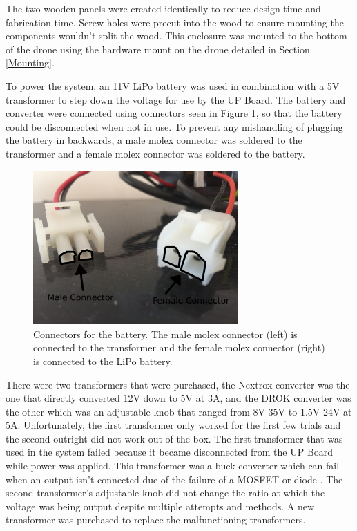 The two wooden panels were created identically to reduce design time and fabrication time. Screw holes were precut into the wood to ensure mounting the components wouldn't split the wood. This enclosure was mounted to the bottom of the drone using the hardware mount on the drone detailed in Section \ref{Mounting}. \par

To power the system, an 11V LiPo battery was used in combination with a 5V transformer to step down the voltage for use by the UP Board. The battery and converter were connected using connectors seen in Figure \ref{fig:connectors}, so that the battery could be disconnected when not in use. To prevent any mishandling of plugging the battery in backwards, a male molex connector was soldered to the transformer and a female molex connector was soldered to the battery.
\begin{figure}[ht!]
	\centering
	\includegraphics[width=0.70\textwidth]{img/connectors_labeled.JPG}
	\caption{Connectors for the battery. The male molex connector (left) is connected to the transformer and the female molex connector (right) is connected to the LiPo battery.}
	\label{fig:connectors}
\end{figure}\par
There were two transformers that were purchased, the Nextrox converter was the one that directly converted 12V down to 5V at 3A, and the DROK converter was the other which was an adjustable knob that ranged from 8V-35V to 1.5V-24V at 5A. Unfortunately, the first transformer only worked for the first few trials and the second outright did not work out of the box. The first transformer that was used in the system failed because it became disconnected from the UP Board while power was applied. This transformer was a buck converter which can fail when an output isn't connected due of the failure of a MOSFET or diode \cite{power_book}. The second transformer's adjustable knob did not change the ratio at which the voltage was being output despite multiple attempts and methods. A new transformer was purchased to replace the malfunctioning transformers. \par

